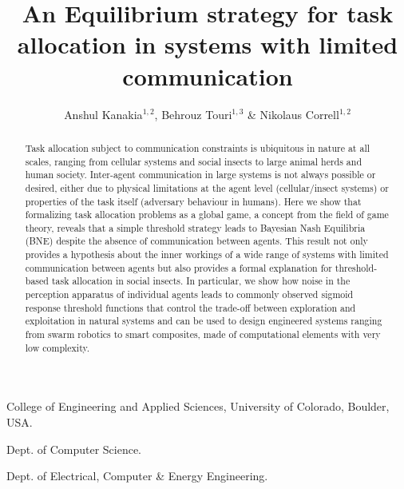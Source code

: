 \documentclass{nature}
\title{An Equilibrium strategy for task allocation in systems with limited communication}
\author{Anshul Kanakia$^{1,2}$, Behrouz Touri$^{1,3}$ \& Nikolaus Correll$^{1,2}$}
\begin{document}
\maketitle
\begin{affiliations}
 \item College of Engineering and Applied Sciences, University of Colorado, Boulder, USA. 
 \item Dept. of Computer Science.
 \item Dept. of Electrical, Computer \& Energy Engineering.
\end{affiliations}

\linenumbers
\begin{abstract}
Task allocation subject to communication constraints is ubiquitous in nature at all scales, ranging from cellular systems\cite{Yoshida2010, Suzuki2015} and social insects\cite{Robinson1987, Gordon1996, Bonabeau1998, Theraulaz1998} to large animal herds\cite{Conradt2003, Conradt2005} and human society\cite{Raafat2009}. Inter-agent communication in large systems is not always possible or desired, either due to physical limitations at the agent level (cellular/insect systems) or properties of the task itself (adversary behaviour in humans).
Here we show that formalizing task allocation problems as a global game, a concept from the field of game theory, reveals that a simple threshold strategy leads to Bayesian Nash Equilibria (BNE) despite the absence of communication between agents. This result not only provides a hypothesis about the inner workings of a wide range of systems with limited communication between agents but also provides a formal explanation for threshold-based task allocation in social insects.
In particular, we show how noise in the perception apparatus of individual agents leads to commonly observed sigmoid response threshold functions that control the trade-off between exploration and exploitation\cite{Bonabeau1997} in natural systems and can be used to design engineered systems ranging from swarm robotics\cite{Martinoli1999, Krieger2000, Kube2000, Mataric2003, Gerkey2004} to smart composites\cite{McEvoy2015}, made of computational elements with very low complexity. 
\end{abstract}
\end{document}

